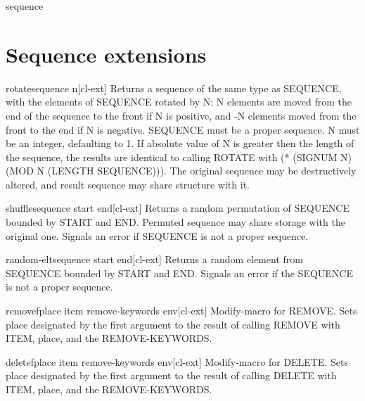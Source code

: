\begin{class}{sequence}{}
  
\end{class}

\section{Sequence extensions}
\label{sec:sequence-extensions}

\begin{function}{rotate}{sequence \op n}[cl-ext]
  Returns a sequence of the same type as SEQUENCE, with the elements of
SEQUENCE rotated by N: N elements are moved from the end of the sequence to
the front if N is positive, and -N elements moved from the front to the end if
N is negative. SEQUENCE must be a proper sequence. N must be an integer,
defaulting to 1. If absolute value of N is greater then the length of the
sequence, the results are identical to calling ROTATE with (* (SIGNUM N) (MOD
N (LENGTH SEQUENCE))). The original sequence may be destructively altered, and
result sequence may share structure with it.
\end{function}

\begin{function}{shuffle}{sequence \key start end}[cl-ext]
  Returns a random permutation of SEQUENCE bounded by START and END.
Permuted sequence may share storage with the original one. Signals an
error if SEQUENCE is not a proper sequence.
\end{function}

\begin{function}{random-elt}{sequence \key start end}[cl-ext]
  Returns a random element from SEQUENCE bounded by START and END. Signals an
error if the SEQUENCE is not a proper sequence.
\end{function}

\begin{macro}{removef}{place item \rest remove-keywords \env env}[cl-ext]
  Modify-macro for REMOVE. Sets place designated by the first argument to
the result of calling REMOVE with ITEM, place, and the REMOVE-KEYWORDS.
\end{macro}

\begin{macro}{deletef}{place item \rest remove-keywords \env env}[cl-ext]
  Modify-macro for DELETE. Sets place designated by the first argument to
the result of calling DELETE with ITEM, place, and the REMOVE-KEYWORDS.
\end{macro}

